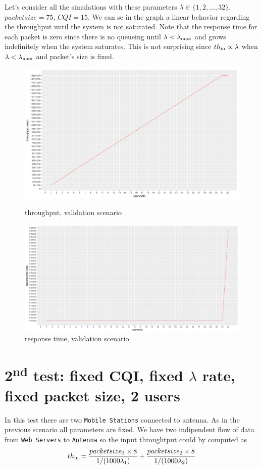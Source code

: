 Let's consider all the simulations with these parameters \(\lambda \in \{1,2,\ldots,32\}\), \(packetsize=75\), \(CQI=15\). We can se in the graph a linear behavior regarding the throughput until the system is not saturated. Note that the response time for each packet is zero since there is no queueing until \(\lambda < \lambda\textsubscript{max}\) and grows indefinitely when the system saturates. This is not surprising since \(th\textsubscript{in} \propto \lambda\) when \(\lambda < \lambda\textsubscript{max}\) and packet's size is fixed.
\begin{figure}[H]
  \includegraphics[width=1\textwidth]{images/plotth_valid}
  \caption{throughput, validation scenario}
  \label{fig:throughput, validation scenario}
  \includegraphics[width=1\textwidth]{images/plotresp_valid}
  \caption{response time, validation scenario}
  \label{fig:response time, validation scenario}
\end{figure}


\section{2\textsuperscript{nd} test: fixed CQI, fixed \(\lambda\) rate, fixed packet size, 2 users}
In this test there are two \texttt{Mobile Stations} connected to antenna. As in the previous scenario all parameters are fixed. We have two indipendent flow of data from \texttt{Web Servers} to \texttt{Antenna} so the input throughtput could by computed as
\[ th\textsubscript{in} = \frac{packetsize\textsubscript{1} \times 8}{1/(1000\lambda\textsubscript{1})} + \frac{packetsize\textsubscript{2} \times 8}{1/(1000\lambda\textsubscript{2})}\]
